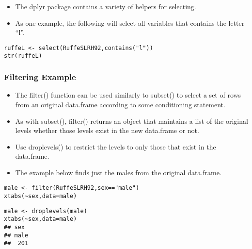 \documentclass{beamer}
\begin{document}
\begin{frame}[verbatim]
\begin{itemize}
\item 
The dplyr package contains a variety of helpers for selecting. 
\item As one example, the following will select all variables that contains the letter “l”.
\end{itemize}
\begin{framed}
\begin{verbatim}
ruffeL <- select(RuffeSLRH92,contains("l"))
str(ruffeL)
\end{verbatim}
\end{framed}

\end{frame}
\begin{frame}
\frametitle{Filtering Example}
\begin{itemize}
\item The filter() function can be used similarly to subset() to select a set of rows from an original data.frame according to some 
conditioning statement. 
\item As with subset(), filter() returns an object that maintains a list of the original levels whether those levels exist in the new data.frame or not.
\item  Use droplevels() to restrict the levels to only those that exist in the data.frame. 
\item The example below finds just the males from the original data.frame.
\end{itemize}
\begin{framed}
\begin{verbatim}male <- filter(RuffeSLRH92,sex=="male")
xtabs(~sex,data=male)
\end{verbatim}
\end{framed}

\end{frame}
\begin{frame}[fragile]

\begin{framed}
\begin{verbatim}
male <- droplevels(male)
xtabs(~sex,data=male)
## sex
## male 
##  201
\end{verbatim}
\end{framed}
\end{frame}
\end{document}
